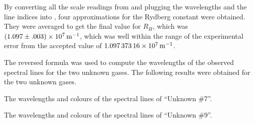 \begin{paper}
By converting all the scale readings from \figHydrogen and plugging the
wavelengths and the line indices into \eqRydberg, four approximations
for the Rydberg constant were obtained.
They were averaged to get the final value for $R_H$, which was
$(1.097\pm.003)\times\SI{E7}{\per\meter}$, which was well within the range of the
experimental error from the accepted value of $\SI{1.09737316E7}{\per\meter}$.

The reversed formula was used to compute the wavelengths of the observed
spectral lines for the two unknown gases.
The following results were obtained for the two unknown gases.

{The wavelengths and colours of the spectral lines of ``Unknown \#7''.}\vspace{1em}

{The wavelengths and colours of the spectral lines of ``Unknown \#9''.}\\


\end{paper}
